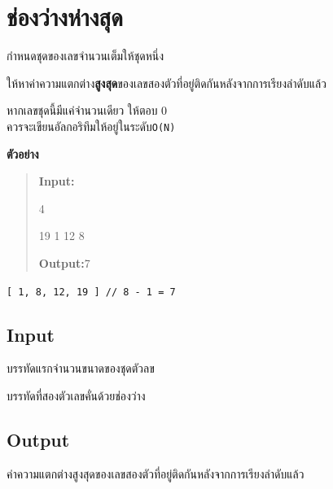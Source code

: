 \documentclass{article}
\begin{document}
\section*{ช่องว่างห่างสุด}

กำหนดชุดของเลขจำนวนเต็มให้ชุดหนึ่ง

ให้หาค่าความแตกต่าง\textbf{สูงสุด}ของเลขสองตัวที่อยู่ติดกันหลังจากการเรียงลำดับแล้ว

หากเลขชุดนี้มีแค่จำนวนเดียว ให้ตอบ 0\\



ควรจะเขียนอัลกอริทึมให้อยู่ในระดับ\texttt{O(N)}



\hfill\break



\textbf{ตัวอย่าง}



\begin{quote}

\textbf{Input:}



4



19 1 12 8



\textbf{Output:}7

\end{quote}



\texttt{{[}\ 1,\ 8,\ 12,\ 19\ {]}\ //\ 8\ -\ 1\ =\ 7}



{}



\subsection*{Input}
บรรทัดแรกจำนวนขนาดของชุดตัวลข



บรรทัดที่สองตัวเลขคั่นด้วยช่องว่าง



\subsection*{Output}
{ค่าความแตกต่าง}{สูงสุด}{ของเลขสองตัวที่อยู่ติดกันหลังจากการเรียงลำดับแล้ว}\\
\end{document}
